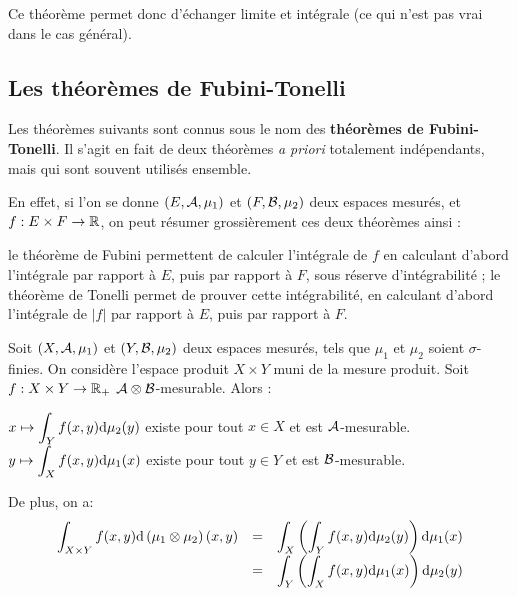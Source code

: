 \documentclass[../integ-proba.tex]{subfiles}
\begin{document}
  \begin{rem}
    Ce théorème permet donc d'échanger limite et intégrale (ce qui n'est pas vrai dans le cas général).
  \end{rem}

  \subsection{Les théorèmes de Fubini-Tonelli}

  Les théorèmes suivants sont connus sous le nom des \textbf{théorèmes de Fubini-Tonelli}.
  Il s'agit en fait de deux théorèmes \textit{a priori} totalement indépendants, mais qui sont souvent utilisés ensemble.

  En effet, si l'on se donne $\left(E, \mathcal{A}, \mu_1\right)$ et $\left(F, \mathcal{B}, \mu_2\right)$ deux espaces mesurés, et $f:E \times F \rightarrow \mathbb{R}$, on peut résumer grossièrement ces deux théorèmes ainsi :
  \begin{itemize}
    \itemb le théorème de Fubini permettent de calculer l'intégrale de $f$ en calculant d'abord l'intégrale par rapport à $E$, puis par rapport à $F$, sous réserve d'intégrabilité ;
    \itemb le théorème de Tonelli permet de prouver cette intégrabilité, en calculant d'abord l'intégrale de $\left|f\right|$ par rapport à $E$, puis par rapport à $F$.
  \end{itemize}

  \begin{thm}
    \label{thm:fubini_positif}
    Soit $\left(X, \mathcal{A}, \mu_1\right)$ et $\left(Y, \mathcal{B}, \mu_2\right)$ deux espaces mesurés, tels que $\mu_1$ et $\mu_2$ soient $\sigma$-finies.
    On considère l'espace produit $X \times Y$ muni de la mesure produit.
    Soit $f:X \times Y \rightarrow \mathbb{R}_+$ $\mathcal{A} \otimes \mathcal{B}$-mesurable.
    Alors :
    \begin{itemize}
      \itemb $\displaystyle x \mapsto \int_Y f(x,y) \textnormal{d}\mu_2(y)$ existe pour tout $x \in X$ et est $\mathcal{A}$-mesurable.
      \itemb $\displaystyle y \mapsto \int_X f(x,y) \textnormal{d}\mu_1(x)$ existe pour tout $y \in Y$ et est $\mathcal{B}$-mesurable.
    \end{itemize}

    De plus, on a:
    \begin{displaymath}
      {
    \everymath={\displaystyle}
    \begin{array}{rcl}
      \int_{X \times Y} f(x,y) \textnormal{d} \left(\mu_1 \otimes \mu_2 \right) (x,y) & = & \int_X \left( \int_Y f(x,y) \textnormal{d} \mu_2(y) \right) \textnormal{d} \mu_1(x)\\
                                                                                      & = & \int_Y \left( \int_X f(x,y) \textnormal{d} \mu_1(x) \right) \textnormal{d} \mu_2(y)\\
    \end{array}
    }
    \end{displaymath}
  \end{thm}
\end{document}
